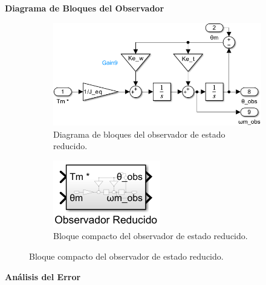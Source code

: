 \documentclass{article}
\begin{document}
\textbf{Diagrama de Bloques del Observador}

\begin{figure}[H]
    \centering
    \begin{subfigure}[t]{0.7\textwidth}
        \centering
        \includegraphics[width=\textwidth]{Imagenes/observador.png}
        \caption{Diagrama de bloques del observador de estado reducido.}
        \label{fig:observador}
    \end{subfigure}
    \hfill %
    \begin{subfigure}[t]{0.2\textwidth}
        \centering
        \includegraphics[width=\textwidth]{Imagenes/observador_compacto.png}
        \caption{Bloque compacto del observador de estado reducido.}
        \label{fig:observador_compacto}
    \end{subfigure}
\end{figure}

\textbf{Análisis del Error}
\end{document}
